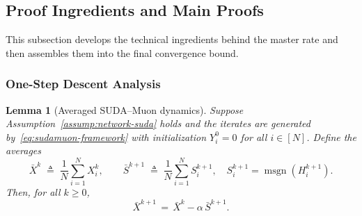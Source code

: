 \documentclass{article}
\newtheorem{lemma}{Lemma}
\begin{document}
\subsection{Proof Ingredients and Main Proofs}
\label{subsec:technical-analysis}

This subsection develops the technical ingredients behind the master rate and then assembles them into the final convergence bound.

\subsubsection*{One-Step Descent Analysis}

\begin{lemma}[Averaged SUDA--Muon dynamics]
\label{lem:sudamuon-average-dynamics}
Suppose Assumption~\ref{assump:network-suda} holds and the iterates are generated by~\eqref{eq:sudamuon-framework} with initialization $Y_i^0=0$ for all $i\in[N]$.
Define the averages
\[
    \bar X^k \;\triangleq\; \frac{1}{N}\sum_{i=1}^N X_i^k,
    \qquad
    \bar S^{k+1} \;\triangleq\; \frac{1}{N}\sum_{i=1}^N S_i^{k+1},\quad S_i^{k+1}=\operatorname{msgn}(H_i^{k+1}).
\]
Then, for all $k\ge 0$,
\begin{equation}
\label{eq:avg-dynamics-barX}
    \bar X^{k+1} \,=\, \bar X^k - \alpha\,\bar S^{k+1}.
\end{equation}
\end{lemma}
\end{document}
